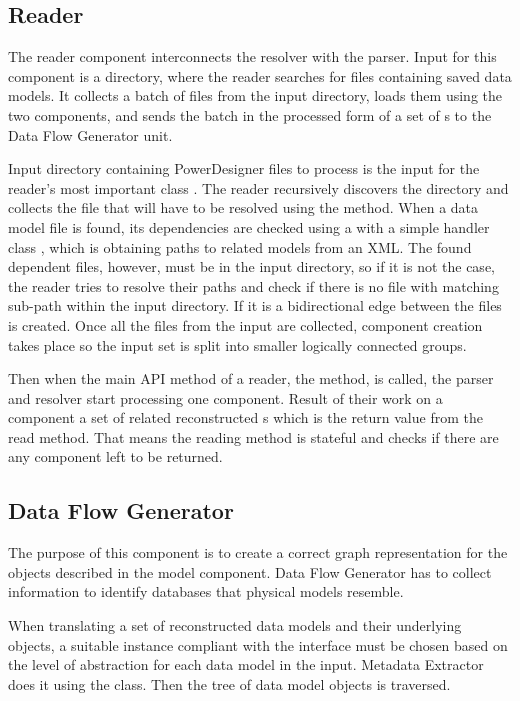 \subsection{Reader}

The reader component interconnects the resolver with the parser. Input for this component is a directory, where the reader searches for files containing saved data models. It collects a batch of files from the input directory, loads them using the two components, and sends the batch in the processed form of a set of s to the Data Flow Generator unit.

Input directory containing PowerDesigner files to process is the input for the reader's most important class . 
The reader recursively discovers the directory and collects the file that will have to be resolved using the  method. 
When a data model file is found, its dependencies are checked using a  with a simple handler class , which is obtaining paths to related models from an XML.
The found dependent files, however, must be in the input directory, so if it is not the case, the reader tries to resolve their paths and check if there is no file with matching sub-path within the input directory. If it is a bidirectional edge between the files is created. 
Once all the files from the input are collected, component creation takes place so the input set is split into smaller logically connected groups.

Then when the main API method of a reader, the  method, is called, the parser and resolver start processing one component. Result of their work on a component a set of related reconstructed s which is the return value from the read method. 
That means the reading method is stateful and  checks if there are any component left to be returned.

\subsection{Data Flow Generator}

The purpose of this component is to create a correct graph representation for the objects described in the model component. Data Flow Generator has to collect information to identify databases that physical models resemble.

When translating a set of reconstructed data models and their underlying objects, a suitable instance compliant with the  interface must be chosen based on the level of abstraction for each data model in the input. Metadata Extractor does it using the  class.
Then the tree of data model objects is traversed.

